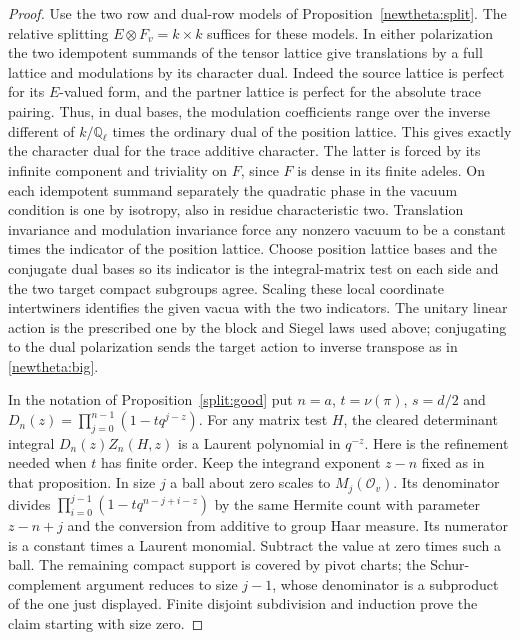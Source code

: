 \begin{proof}
Use the two row and dual-row models of
Proposition~\ref{newtheta:split}. The relative splitting
\(E\otimes F_v=k\times k\) suffices for these models. In either
polarization the two idempotent summands of the tensor lattice give
translations by a full lattice and modulations by its character dual.
Indeed the source lattice is perfect for its \(E\)-valued form,
and the partner lattice is perfect for the absolute trace pairing.
Thus, in dual bases, the modulation coefficients range over the
inverse different of \(k/\mathbb Q_\ell\) times the ordinary dual
of the position lattice. This gives exactly the character dual for
the trace additive character. The latter is forced by its infinite
component and triviality on \(F\), since \(F\) is dense in its
finite adeles. On each idempotent summand separately the quadratic
phase in the vacuum condition is one by isotropy, also in residue
characteristic two. Translation invariance and modulation invariance
force any nonzero vacuum to be a constant times the indicator of
the position lattice. Choose position lattice bases and the
conjugate dual bases so its indicator is the integral-matrix test
on each side and the two target compact subgroups agree. Scaling
these local coordinate intertwiners identifies the given vacua
with the two indicators. The unitary linear action is the prescribed
one by the block and Siegel laws used above; conjugating to the dual
polarization sends the target action to inverse transpose as in
\eqref{newtheta:big}.

In the notation of Proposition~\ref{split:good} put \(n=a\),
\(t=\nu(\pi)\), \(s=d/2\) and
\(D_n(z)=\prod_{j=0}^{n-1}(1-tq^{j-z})\).
For any matrix test \(H\), the cleared determinant integral
\(D_n(z)Z_n(H,z)\) is a Laurent polynomial in \(q^{-z}\).
Here is the refinement needed when \(t\) has finite order. Keep the
integrand exponent \(z-n\) fixed as in that proposition. In size
\(j\) a ball about zero scales to \(M_j(\mathcal O_v)\). Its
denominator divides
\(\prod_{i=0}^{j-1}(1-tq^{n-j+i-z})\) by the same Hermite
count with parameter \(z-n+j\) and the conversion from additive
to group Haar measure. Its numerator is a constant times a
Laurent monomial. Subtract the value at zero times such a ball.
The remaining compact support is covered by pivot charts; the
Schur-complement argument reduces to size \(j-1\), whose denominator
is a subproduct of the one just displayed. Finite disjoint
subdivision and induction prove the claim starting with size zero.


\end{proof}

